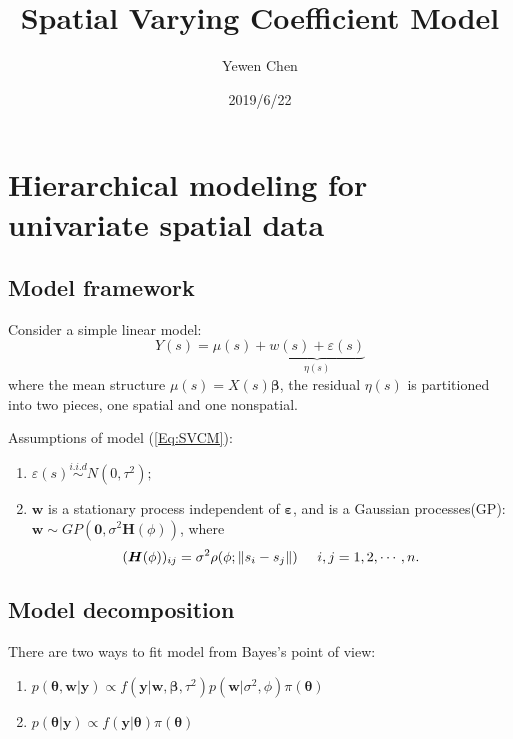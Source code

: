 \documentclass[
]{article}
\title{Spatial Varying Coefficient Model}
\author{Yewen Chen}
\date{2019/6/22}
\begin{document}
\maketitle

{
\setcounter{tocdepth}{2}
\tableofcontents
}
\Large
\newpage

\hypertarget{hierarchical-modeling-for-univariate-spatial-data}{%
\section{Hierarchical modeling for univariate spatial
data}\label{hierarchical-modeling-for-univariate-spatial-data}}

\hypertarget{model-framework}{%
\subsection{Model framework}\label{model-framework}}

Consider a simple linear model: \begin{equation}
   Y(s)=\mu(s)+\underbrace{w(s)+\varepsilon(s)}_{\eta(s)} \label{Eq:SVCM}
  \end{equation} where the mean structure \(\mu(s)=X(s)\bm{\beta}\), the
residual \(\eta(s)\) is partitioned into two pieces, one spatial and one
nonspatial.

Assumptions of model (\ref{Eq:SVCM}):

\begin{enumerate}
\def\labelenumi{\alph{enumi}.}
\item
  \(\varepsilon(s)\overset{i.i.d}{\sim} N(0,\tau^2);\)
\item
  \(\bm{w}\) is a stationary process independent of
  \(\bm{\varepsilon}\), and is a Gaussian processes(GP):
  \(\bm{w}\sim GP(\bm{0},\sigma^2\bm{H}(\phi))\), where
  \[(\bm{H}(\phi))_{ij}=\sigma^2\rho(\phi;\Vert s_i-s_j\Vert){\kern 14pt} i,j=1,2,\cdots,n.\]
\end{enumerate}

\hypertarget{model-decomposition}{%
\subsection{Model decomposition}\label{model-decomposition}}

There are two ways to fit model from Bayes's point of view:

\begin{enumerate}
\def\labelenumi{(\alph{enumi})}
\item
  \(p(\bm{\theta,w}|\bm{y})\propto f(\bm{y}|\bm{w},\bm{\beta},\tau^2)p(\bm{w}|\sigma^2,\phi)\pi(\bm{\theta})\)
\item
  \(p(\bm{\theta}|\bm{y})\propto f(\bm{y}|\bm{\theta})\pi(\bm{\theta})\)
\end{enumerate}
\end{document}
